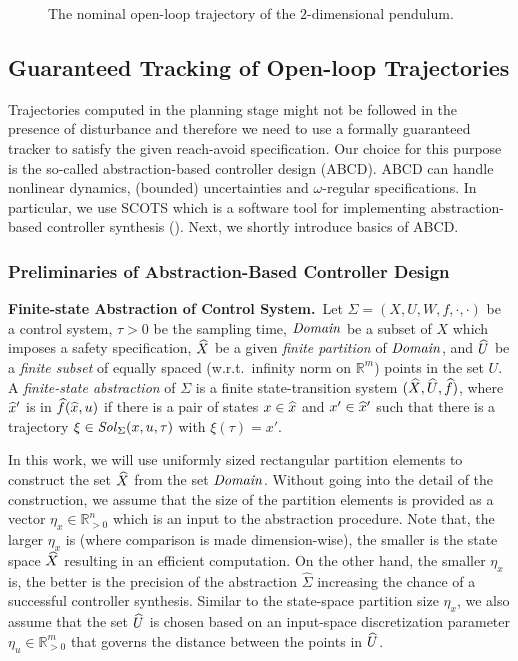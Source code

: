 \begin{remark}
\begin{figure}
		\caption{The nominal open-loop trajectory of the $2$-dimensional pendulum.}
		\label{fig:traj 2d pendulum}
	\end{figure}
\end{remark}


\subsection{Guaranteed Tracking of Open-loop Trajectories}
Trajectories computed in the planning stage might not be followed in the presence of disturbance and therefore we need to use a formally guaranteed tracker to satisfy the given reach-avoid specification. Our choice for this purpose is the so-called abstraction-based controller design (ABCD). ABCD can handle nonlinear dynamics, (bounded) uncertainties and $\omega$-regular specifications. In particular, we use SCOTS which is a software tool for implementing abstraction-based controller synthesis (\cite{Rungger2016scots}). Next, we shortly introduce basics of ABCD.
\subsubsection{Preliminaries of Abstraction-Based Controller Design}\hfill


\smallskip
\noindent\textbf{Finite-state Abstraction of Control System.}\
Let $\Sigma = (X, U, W, f, \cdot, \cdot)$ be a control system, $\tau>0$ be the sampling time, $\mathit{Domain}$ be a subset of $X$ which imposes a safety specification, $\widehat{X}$ be a given \emph{finite partition} of $\mathit{Domain}$, and $\widehat{U}$ be a \emph{finite subset} of equally spaced (w.r.t.\ infinity norm on $\mathbb{R}^m$) points in the set $U$.
A \emph{finite-state abstraction} of $\Sigma$ is a finite state-transition system $(\widehat{X},\widehat{U},\widehat{f})$, where $\widehat{x}'$ is in $\widehat{f}(\widehat{x},u)$ if there is a pair of states $x\in \widehat{x}$ and $x'\in \widehat{x}'$ such that there is a trajectory $\xi\in \mathit{Sol}_\Sigma(x,u,\tau)$ with $\xi(\tau)=x'$.

In this work, we will use uniformly sized rectangular partition elements to construct the set $\widehat{X}$ from the set $\mathit{Domain}$.
Without going into the detail of the construction, we assume that the size of the partition elements is provided as a vector $\eta_x\in \mathbb{R}^n_{>0}$ which is an input to the abstraction procedure.
Note that, the larger $\eta_x$ is (where comparison is made dimension-wise), the smaller is the state space $\widehat{X}$ resulting in an efficient computation.
On the other hand, the smaller $\eta_x$ is, the better is the precision of the abstraction $\widehat{\Sigma}$ increasing the chance of a successful controller synthesis. Similar to the state-space partition size $\eta_x$, we also assume that the set $\widehat{U}$ is chosen based on an input-space discretization parameter $\eta_u\in \mathbb{R}^m_{>0}$ that governs the distance between the points in $\widehat{U}$.

